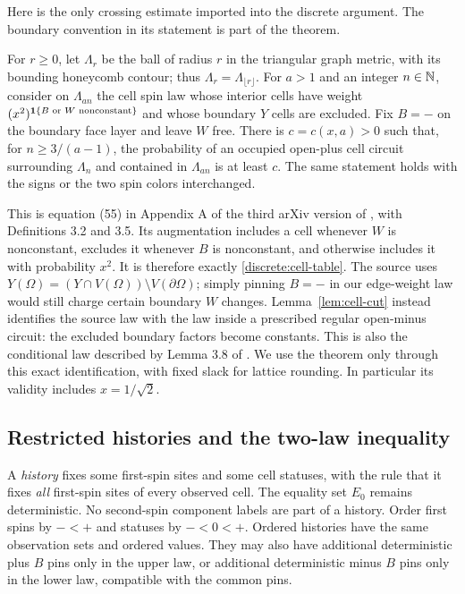\begin{samepage}
Here is the only crossing estimate imported into the discrete argument.
The boundary convention in its statement is part of the theorem.

\begin{theorem}\label{thm:circuit-input}
For $r\ge0$, let $\Lambda_r$ be the ball of radius $r$ in the triangular
graph metric, with its bounding honeycomb contour; thus
$\Lambda_r=\Lambda_{\lfloor r\rfloor}$. For $a>1$ and an integer
$n\in\mathbb N$, consider on
$\Lambda_{an}$ the cell spin law whose
interior cells have weight $(x^2)^{\mathbf 1\{B\text{ or }W\text{ nonconstant}\}}$
and whose boundary $Y$ cells are excluded. Fix $B=-$ on the boundary face
layer and leave $W$ free. There is $c=c(x,a)>0$ such
that, for $n\ge 3/(a-1)$, the probability of an occupied open-plus cell
circuit surrounding $\Lambda_n$ and contained in $\Lambda_{an}$ is at
least $c$. The same statement holds with the signs or the two spin colors
interchanged.
\end{theorem}
\end{samepage}

This is equation (55) in Appendix A of the third arXiv version of
\cite{GL2025}, with Definitions 3.2 and 3.5. Its augmentation includes a
cell whenever $W$ is nonconstant, excludes it whenever $B$ is nonconstant,
and otherwise includes it with probability $x^2$. It is therefore exactly
\eqref{discrete:cell-table}. The source uses
$Y(\Omega)=(Y\cap V(\Omega))\setminus V(\partial\Omega)$; simply pinning
$B=-$ in our edge-weight law would still charge certain boundary $W$
changes. Lemma~\ref{lem:cell-cut} instead identifies the source law with
the law inside a prescribed regular open-minus circuit: the excluded
boundary factors become constants. This is also the conditional law
described by Lemma 3.8 of \cite{GL2025}. We use the theorem only through
this exact identification, with fixed slack for lattice rounding. In
particular its validity includes $x=1/\sqrt2$.

\subsection{Restricted histories and the two-law inequality}

A \emph{history} fixes some first-spin sites and some cell statuses, with
the rule that it fixes \emph{all} first-spin sites of every observed cell.
The equality set $E_0$ remains deterministic. No second-spin component
labels are part of a history. Order first spins by $-<+$ and statuses by
$-<0<+$. Ordered histories have the same observation sets and ordered
values. They may also have additional deterministic plus $B$ pins only in
the upper law, or additional deterministic minus $B$ pins only in the
lower law, compatible with the common pins.

